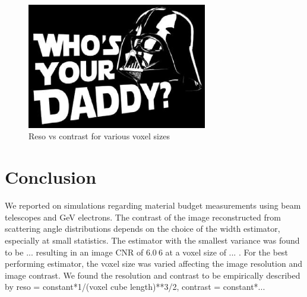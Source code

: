 \documentclass{PoS}
\begin{document}
\begin{figure}[t!]
  \centering
  \includegraphics[width=0.70\textwidth]{figures/dummy.eps}
    \caption[contrast]{%
    Reso vs contrast for various voxel sizes}
  \label{fig:resovscontrast}
\end{figure}


\section{Conclusion}

We reported on simulations regarding material budget measurements using beam telescopes and GeV electrons. 
The contrast of the image reconstructed from scattering angle distributions depends on the choice of the width estimator, especially at small statistics. 
The estimator with the smallest variance was found to be ... resulting in an image CNR of $\SI{6.0}{6}$  at a voxel size of ... . %
For the best performing estimator, the voxel size was varied affecting the image resolution and image contrast. 
We found the resolution and contrast to be empirically described by reso = constant*1/(voxel cube length)**3/2, contrast = constant*...






\end{document}
